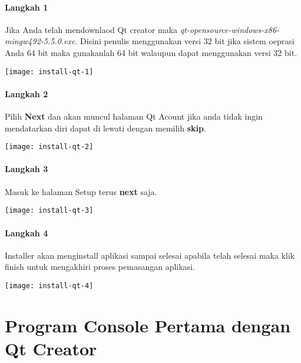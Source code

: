 \paragraph{Langkah 1}
  Jika Anda telah mendownlaod Qt creator maka
  \textit{qt-opensource-windows-x86-mingw492-5.5.0.exe}. Disini penulis
  menggunakan versi 32 bit jika sistem oeprasi Anda 64 bit maka
  gunakanlah 64 bit walaupun dapat menggunakan versi 32 bit.
 
\begin{center}
	 \texttt{[image: install-qt-1]}
\end{center}
 



\paragraph{Langkah 2}
  Pilih \textbf{Next} dan akan muncul halaman Qt Acount jika anda tidak
  ingin mendatarkan diri dapat di lewati dengan memilih \textbf{skip}.

\begin{center}
	 \texttt{[image: install-qt-2]}
\end{center}
 


  
\paragraph{Langkah 3}
  Masuk ke halaman Setup terus \textbf{next} saja.

  
\begin{center}
	 \texttt{[image: install-qt-3]}
\end{center}
 


  
\paragraph{Langkah 4}
  Installer akan menginstall aplikasi sampai selesai apabila telah
  selesai maka klik finish untuk mengakhiri proses pemasangan aplikasi.


  


\begin{center}

	\texttt{[image: install-qt-4]}
\end{center}

\section{Program Console Pertama dengan Qt
Creator}\label{program-console-pertama-dengan-qt-creator}



